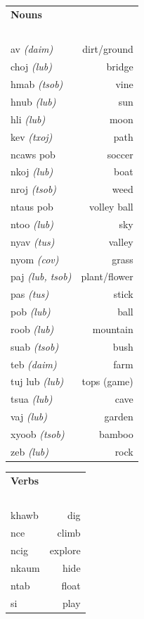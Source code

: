 \documentclass{article}
\begin{document}
\begin{multicols}{2}
\begin{tabular}{l r}
\end{tabular}
\end{multicols}

\clearpage

\begin{multicols}{2}
[
\section*{}
\begin{center}\rule{\textwidth}{.4pt}\end{center}
]

\begin{tabular}{l r}
\textbf{Nouns} \\
~\\
av {\em (daim)} &dirt/ground\\
choj {\em (lub)} &bridge\\
hmab {\em (tsob)} &vine\\
hnub {\em (lub)} &sun\\
hli {\em (lub)} &moon\\
kev {\em (txoj)} &path\\
ncaws pob &soccer\\
nkoj {\em (lub)} &boat\\
nroj {\em (tsob)} &weed\\
ntaus pob &volley ball\\
ntoo {\em (lub)} &sky\\
nyav {\em (tus)} &valley\\
nyom {\em (cov)} &grass\\
paj {\em (lub, tsob)} &plant/flower\\
pas {\em (tus)} &stick\\
pob {\em (lub)} &ball\\
roob {\em (lub)} &mountain\\
suab {\em (tsob)} &bush\\
teb {\em (daim)} &farm\\
tuj lub {\em (lub)} &tops (game)\\
tsua {\em (lub)} &cave\\
vaj {\em (lub)} &garden\\
xyoob {\em (tsob)} &bamboo\\
zeb {\em (lub)} &rock\\
\end{tabular}

\begin{tabular}{l r}
\textbf{Verbs} \\
~\\
khawb &dig\\
nce &climb\\
ncig &explore\\
nkaum &hide\\
ntab &float\\
si &play\\

\end{tabular}
\end{multicols}
\end{document}

